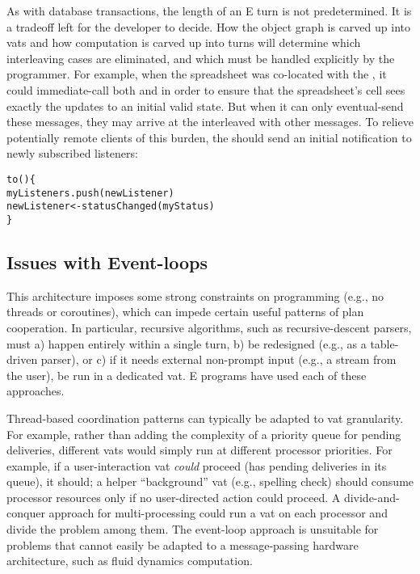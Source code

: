 \documentclass{llncs}
\begin{document}
As with database transactions, the length of an E turn is not
predetermined. It is a tradeoff left for the developer to decide. How
the object graph is carved up into vats and how computation is carved
up into turns will determine which interleaving cases are eliminated,
and which must be handled explicitly by the programmer. For example,
when the spreadsheet was co-located with the , it
could immediate-call both  and  in
order to ensure that the spreadsheet's cell sees exactly the updates
to an initial valid state. But when it can only eventual-send these
messages, they may arrive at the  interleaved with
other messages. To relieve potentially remote clients of this burden,
the  should send an initial notification to newly
subscribed listeners:
%
\begin{alltt}
    to () \{
        myListeners.push(newListener)
        newListener <- statusChanged(myStatus)
    \}
\end{alltt}
%

\subsection{Issues with Event-loops}

This architecture imposes some strong constraints on programming
(e.g., no threads or coroutines), which can impede certain useful
patterns of plan cooperation. In particular, recursive algorithms,
such as recursive-descent parsers, must a) happen entirely within a
single turn, b) be redesigned (e.g., as a table-driven parser), or c)
if it needs external non-prompt input (e.g., a stream from the user),
be run in a dedicated vat. E programs have used each of these
approaches.

Thread-based coordination patterns can typically be adapted to vat
granularity.  For example, rather than adding the complexity of a
priority queue for pending deliveries, different vats would simply run
at different processor priorities. For example, if a user-interaction
vat \emph{could} proceed (has pending deliveries in its queue), it
should; a helper ``background'' vat (e.g., spelling check) should
consume processor resources only if no user-directed action could
proceed. A divide-and-conquer approach for multi-processing could run a
vat on each processor and divide the problem among them. The
event-loop approach is unsuitable for problems that cannot easily be
adapted to a message-passing hardware architecture, such as fluid
dynamics computation.
\end{document}
